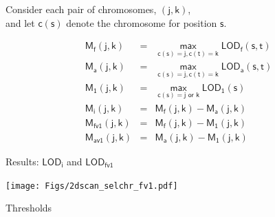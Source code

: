 \documentclass[12pt]{article}
\newcommand{\headsize}{\fontsize{35}{35} \selectfont}
\newcommand{\smallersize}{\fontsize{20}{25} \selectfont}
\newcommand{\lod}{\text{LOD}}
\newcommand{\M}{\text{M}}
\begin{document}
\hfill \begin{minipage}[t]{10in}
Consider each pair of chromosomes, {\color{myblue} $\mathsf{(j, k)}$}, \\
and let {\color{myblue} $\mathsf{c(s)}$} denote the chromosome for
  position {\color{myblue} $\mathsf{s}$}.

\vspace{5mm}

\hspace{1in}
\begin{minipage}{6in}
{\color{myblue}
\begin{eqnarray*}
\mathsf{\M_f(j,k)}& = &\mathsf{ \max_{c(s)=j, c(t)=k} \lod_f(s,t)} \\[12pt]
\mathsf{\M_a(j,k)}& = &\mathsf{ \max_{c(s)=j, c(t)=k} \lod_a(s,t)} \\[12pt]
\mathsf{\M_1(j,k)}& = &\mathsf{ \max_{c(s)=j \text{ or } k} \lod_1(s)} \\[36pt]
\mathsf{\M_i(j,k)}& = &\mathsf{ \M_f(j,k) - \M_a(j,k)}\\[12pt]
\mathsf{\M_{fv1}(j,k)}& = &\mathsf{ \M_f(j,k) - \M_1(j,k)}\\[12pt]
\mathsf{\M_{av1}(j,k)}& = &\mathsf{ \M_a(j,k) - \M_1(j,k)}
\end{eqnarray*}
}
\end{minipage}
\end{minipage}

\newpage

\headsize \color{myyellow}
\hfill \begin{minipage}{5.75in}
\centering
Results: $\mathsf{\lod_i}$ and $\mathsf{\lod_{fv1}}$
\end{minipage}

\vfill 

\centerline{\texttt{[image: Figs/2dscan\_selchr\_fv1.pdf]}}



\newpage

\headsize \color{myyellow}
\hfill \begin{minipage}{5.75in}
\centering
Thresholds
\end{minipage}

\vspace{20mm}

\color{mywhite} \smallersize
\end{document}
